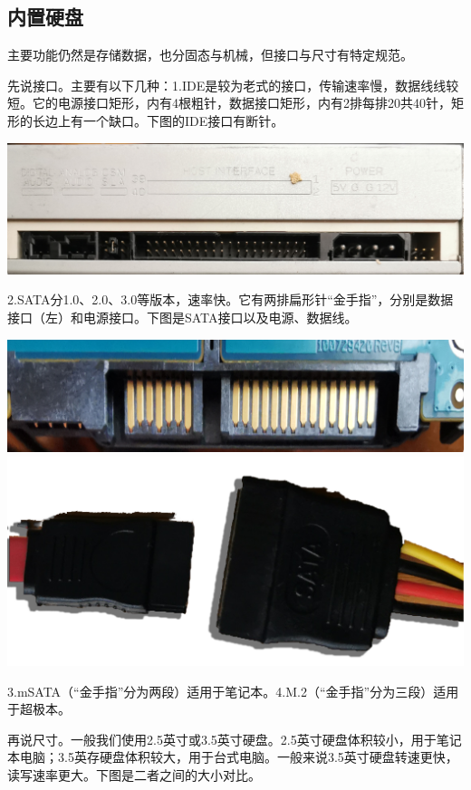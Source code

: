 \subsection{内置硬盘}
主要功能仍然是存储数据，也分固态与机械，但接口与尺寸有特定规范。\par
先说接口。主要有以下几种：1.IDE是较为老式的接口，传输速率慢，数据线线较短。它的电源接口矩形，内有4根粗针，数据接口矩形，内有2排每排20共40针，矩形的长边上有一个缺口。下图的IDE接口有断针。
\begin{center}
	\includegraphics[scale=0.1]{pic/IDE}
\end{center} \par
2.SATA分1.0、2.0、3.0等版本，速率快。它有两排扁形针“金手指”，分别是数据接口（左）和电源接口。下图是SATA接口以及电源、数据线。
\begin{center}
	\includegraphics[scale=0.1]{pic/sata}\\\includegraphics[scale=0.3]{pic/SATA-Lines}	
\end{center} \par
3.mSATA（“金手指”分为两段）适用于笔记本。4.M.2（“金手指”分为三段）适用于超极本。\par
再说尺寸。一般我们使用2.5英寸或3.5英寸硬盘。2.5英寸硬盘体积较小，用于笔记本电脑；3.5英存硬盘体积较大，用于台式电脑。一般来说3.5英寸硬盘转速更快，读写速率更大。下图是二者之间的大小对比。
